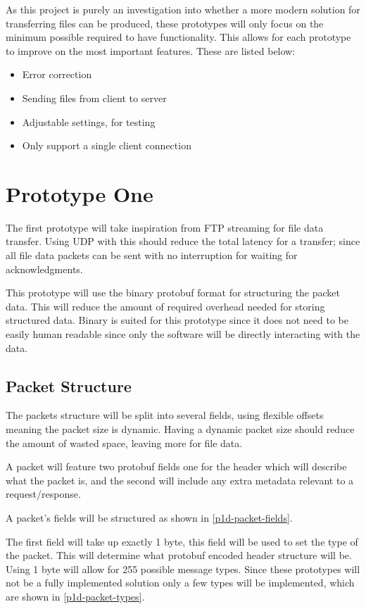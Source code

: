 As this project is purely an investigation into whether a more modern solution for transferring files can be produced, these prototypes will only focus on the minimum possible required to have functionality. This allows for each prototype to improve on the most important features. These are listed below:

\begin{itemize}
	\item Error correction
	\item Sending files from client to server
	\item Adjustable settings, for testing
	\item Only support a single client connection
\end{itemize}


\section{Prototype One}
The first prototype will take inspiration from FTP streaming for file data transfer. Using UDP with this should reduce the total latency for a transfer; since all file data packets can be sent with no interruption for waiting for acknowledgments.

This prototype will use the binary protobuf format for structuring the packet data. This will reduce the amount of required overhead needed for storing structured data. Binary is suited for this prototype since it does not need to be easily human readable since only the software will be directly interacting with the data.

\subsection*{Packet Structure}
The packets structure will be split into several fields, using flexible offsets meaning the packet size is dynamic. Having a dynamic packet size should reduce the amount of wasted space, leaving more for file data.

A packet will feature two protobuf fields one for the header which will describe what the packet is, and the second will include any extra metadata relevant to a request/response.

A packet's fields will be structured as shown in \ref{p1d-packet-fields}.

The first field will take up exactly 1 byte, this field will be used to set the type of the packet. This will determine what protobuf encoded header structure will be. Using 1 byte will allow for 255 possible message types. Since these prototypes will not be a fully implemented solution only a few types will be implemented, which are shown in \ref{p1d-packet-types}.

